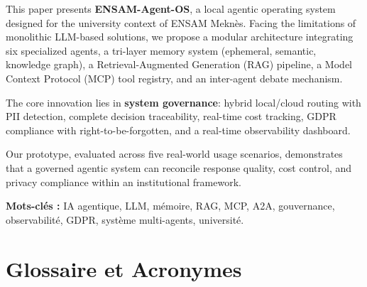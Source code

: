 \documentclass[12pt, a4paper]{article}
\newcommand{\acrshort}[1]{\MakeUppercase{#1}}
\begin{document}
\vspace{0.5cm}

\begin{definitionbox}
This paper presents \textbf{ENSAM-Agent-OS}, a local agentic operating system designed for the university context of ENSAM Meknès. Facing the limitations of monolithic LLM-based solutions, we propose a modular architecture integrating six specialized agents, a tri-layer memory system (ephemeral, semantic, knowledge graph), a Retrieval-Augmented Generation (RAG) pipeline, a Model Context Protocol (MCP) tool registry, and an inter-agent debate mechanism.

The core innovation lies in \textbf{system governance}: hybrid local/cloud routing with PII detection, complete decision traceability, real-time cost tracking, GDPR compliance with right-to-be-forgotten, and a real-time observability dashboard.

Our prototype, evaluated across five real-world usage scenarios, demonstrates that a governed agentic system can reconcile response quality, cost control, and privacy compliance within an institutional framework.
\end{definitionbox}

\vspace{0.5cm}
\noindent\textbf{Mots-clés :} IA agentique, \acrshort{llm}, mémoire, \acrshort{rag}, \acrshort{mcp}, \acrshort{a2a}, gouvernance, observabilité, \acrshort{gdpr}, système multi-agents, université.



\newpage
\tableofcontents

\newpage
\section*{Glossaire et Acronymes}
\end{document}

